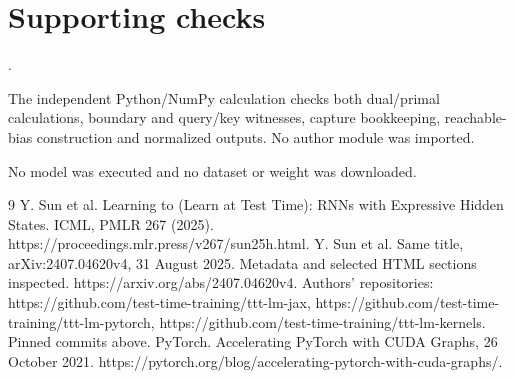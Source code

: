 \documentclass[10pt]{article}
\begin{document}
\section*{Supporting checks}
.\par
The independent Python/NumPy calculation checks both dual/primal calculations, boundary and query/key witnesses, capture bookkeeping, reachable-bias construction and normalized outputs. No author module was imported.\par
No model was executed and no dataset or weight was downloaded.\par
9 Y. Sun et al. Learning to (Learn at Test Time): RNNs with Expressive Hidden States. ICML, PMLR 267 (2025). https://proceedings.mlr.press/v267/sun25h.html. Y. Sun et al. Same title, arXiv:2407.04620v4, 31 August 2025. Metadata and selected HTML sections inspected. https://arxiv.org/abs/2407.04620v4. Authors’ repositories: https://github.com/test-time-training/ttt-lm-jax, https://github.com/test-time-training/ttt-lm-pytorch, https://github.com/test-time-training/ttt-lm-kernels. Pinned commits above. PyTorch. Accelerating PyTorch with CUDA Graphs, 26 October 2021. https://pytorch.org/blog/accelerating-pytorch-with-cuda-graphs/.\par
\end{document}
